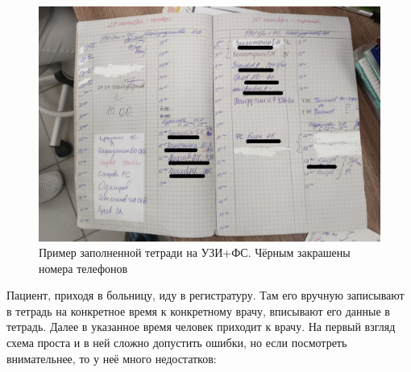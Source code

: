 \documentclass[a4paper,article]{article}
\begin{document}
        \begin{figure}[h]

            \centering

            \includegraphics[width=0.8\linewidth]{Пример заполненной тетради на УЗИ+ФС. Чёрным закрашены номера телефонов.png}

            \caption{\centering Пример заполненной тетради на УЗИ+ФС. Чёрным закрашены номера телефонов}

            \label{fig:Тетрадь на УЗИ+ФС}

        \end{figure}

        Пациент, приходя в больницу, иду в регистратуру. Там его вручную записывают в тетрадь на конкретное время к конкретному врачу, вписывают его данные в тетрадь. Далее в указанное время человек приходит к врачу.
        На первый взгляд схема проста и в ней сложно допустить ошибки, но если посмотреть внимательнее, то у неё много недостатков:
\end{document}
